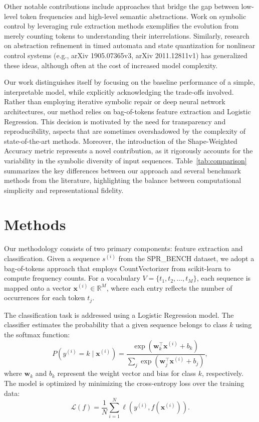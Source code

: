 \documentclass{article}
\begin{document}
Other notable contributions include approaches that bridge the gap between low-level token frequencies and high-level semantic abstractions. Work on symbolic control by leveraging rule extraction methods exemplifies the evolution from merely counting tokens to understanding their interrelations. Similarly, research on abstraction refinement in timed automata and state quantization for nonlinear control systems (e.g., arXiv 1905.07365v3, arXiv 2011.12811v1) has generalized these ideas, although often at the cost of increased model complexity.

Our work distinguishes itself by focusing on the baseline performance of a simple, interpretable model, while explicitly acknowledging the trade-offs involved. Rather than employing iterative symbolic repair or deep neural network architectures, our method relies on bag-of-tokens feature extraction and Logistic Regression. This decision is motivated by the need for transparency and reproducibility, aspects that are sometimes overshadowed by the complexity of state-of-the-art methods. Moreover, the introduction of the Shape-Weighted Accuracy metric represents a novel contribution, as it rigorously accounts for the variability in the symbolic diversity of input sequences. Table~\ref{tab:comparison} summarizes the key differences between our approach and several benchmark methods from the literature, highlighting the balance between computational simplicity and representational fidelity.

\section{Methods}
Our methodology consists of two primary components: feature extraction and classification. Given a sequence \( s^{(i)} \) from the SPR\_BENCH dataset, we adopt a bag-of-tokens approach that employs CountVectorizer from scikit-learn to compute frequency counts. For a vocabulary \( V = \{t_1, t_2, \dots, t_M\} \), each sequence is mapped onto a vector \( \mathbf{x}^{(i)} \in \mathbb{R}^M \), where each entry reflects the number of occurrences for each token \( t_j \).

The classification task is addressed using a Logistic Regression model. The classifier estimates the probability that a given sequence belongs to class \( k \) using the softmax function:
\[
P(y^{(i)} = k \mid \mathbf{x}^{(i)}) = \frac{\exp(\mathbf{w}_k^\top \mathbf{x}^{(i)} + b_k)}{\sum_{j} \exp(\mathbf{w}_j^\top \mathbf{x}^{(i)} + b_j)},
\]
where \( \mathbf{w}_k \) and \( b_k \) represent the weight vector and bias for class \( k \), respectively. The model is optimized by minimizing the cross-entropy loss over the training data:
\[
\mathcal{L}(f) = \frac{1}{N} \sum_{i=1}^{N} \ell\left(y^{(i)}, f(\mathbf{x}^{(i)})\right).
\]
\end{document}
